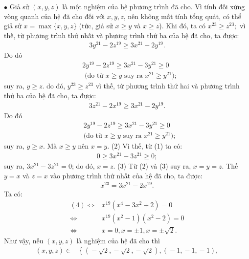 \begin{multicols}{2}
	\vskip 0.05cm
	$\bullet$ Giả sử $(x, y, z)$ là một nghiệm của hệ phương trình đã cho.
	\vskip 0.05cm
	Vì tính đối xứng vòng quanh của hệ đã cho đối với $x, y, z$, nên không mất tính tổng quát, có thể giả sử $x = \max\{x, y, z\}$ (tức, giả sử $x \ge y$ và $x \ge z$).
	\vskip 0.05cm
	Khi đó, ta có ${x^{23}} \ge {z^{23}};$ vì thế, từ phương trình thứ nhất và phương trình thứ ba của hệ đã cho, ta được:
	\begin{align*}
		3{y^{21}} - 2{z^{19}} \ge 3{x^{21}} - 2{y^{19}}.
	\end{align*}
	Do đó 
	\begin{align*}
		&2{y^{19}} - 2{z^{19}} \ge 3{x^{21}} - 3{y^{21}} \ge 0 \\
		&\text{ (do từ } x \ge y \text{ suy ra } x^{21} \ge y^{21});
	\end{align*}
	suy ra, $y \ge z$. do đó,  $y^{23} \ge z^{23}$ vì thế, từ phương trình thứ hai và phương trình thứ ba của hệ đã cho, ta được:
	\begin{align*}
		3{z^{21}} - 2{x^{19}} \ge 3{x^{21}} - 2{y^{19}}.
	\end{align*}
	Do đó
	\begin{align*}
		&2{y^{19}} - 2{z^{19}} \ge 3{x^{21}} - 3{y^{21}} \ge 0 \\
		&\text{(do từ } x \ge y \text{ suy ra } x^{21} \ge y^{21}); \tag{$1$}
	\end{align*}
	suy ra, $y \ge x$. Mà $x \ge y$ nên $x = y$.  \hfill ($2$)
	\vskip 0.05cm
	Vì thế, từ ($1$) ta có:
	\begin{align*}
		0 \ge 3{x^{21}} - 3{z^{21}} \ge 0;
	\end{align*}
	suy ra, $3{x^{21}} - 3{z^{21}} = 0$; do đó, $x = z$. \hfill ($3$)
	\vskip 0.05cm
	Từ ($2$) và ($3$) suy ra, $x = y = z$.
	\vskip 0.05cm
	Thế $y = x$ và $z = x$ vào phương trình thứ nhất của hệ đã cho, ta được:
	\begin{align*}
		{x^{23}} = 3{x^{21}} - 2{x^{19}}. \tag{$4$}
	\end{align*}
	Ta có:
	\begin{align*}
		(4) \Leftrightarrow& {x^{19}}\left( {{x^4} - 3{x^2} + 2} \right) = 0\\
			\Leftrightarrow &{x^{19}}\left( {{x^2} - 1} \right)\left( {{x^2} - 2} \right) = 0\\
			\Leftrightarrow & x = 0,x =  \pm 1,x =  \pm \sqrt 2 .
	\end{align*}
	Như vậy, nếu $(x, y, z)$ là nghiệm của hệ đã cho thì
	\begin{align*}
		\left( {x,y,z} \right) \in &\left\{\!\! \left( { \!-\! \sqrt 2 , \!-\! \sqrt 2 , \!-\! \sqrt 2 } \right)\!,\!\left( { \!-\! 1, \!-\! 1, \!-\! 1} \right)\!,\right.\\

\end{align*}
\end{multicols}
